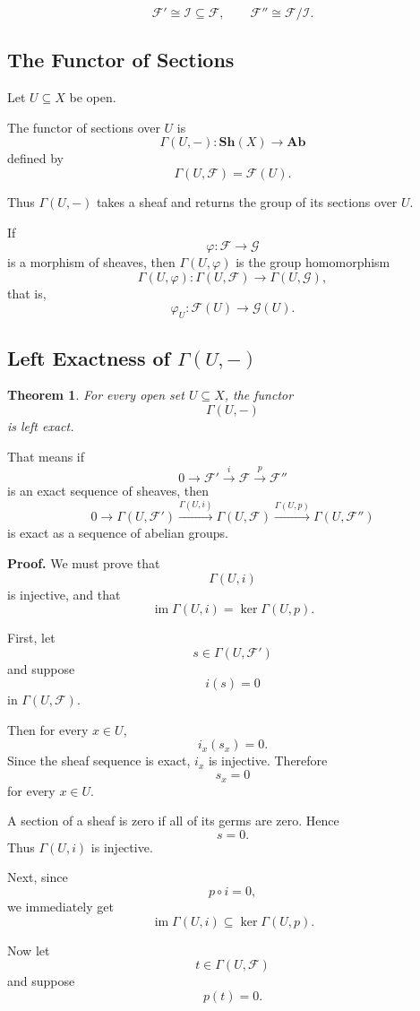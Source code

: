 \documentclass[12pt,a4paper]{article}
\DeclareMathOperator{\im}{im}
\newcommand{\Ab}{\mathbf{Ab}}
\newcommand{\Sh}{\mathbf{Sh}}
\newcommand{\F}{\mathcal F}
\newcommand{\G}{\mathcal G}
\theoremstyle{notespace}
\newtheorem{theorem}[definition]{Theorem}
\newcommand{\Fp}{\mathcal F'}      %
\newcommand{\Fpp}{\mathcal F''}
\begin{document}
\[
\boxed{
	\Fp\cong \mathcal I\subseteq \F,
	\qquad
	\Fpp\cong \F/\mathcal I.
}
\]

\subsection{The Functor of Sections}

Let \(U\subseteq X\) be open.

The functor of sections over \(U\) is
\[
\Gamma(U,-):\Sh(X)\to \Ab
\]
defined by
\[
\Gamma(U,\F)=\F(U).
\]

Thus \(\Gamma(U,-)\) takes a sheaf and returns the group of its sections over \(U\).

If
\[
\varphi:\F\to \G
\]
is a morphism of sheaves, then \(\Gamma(U,\varphi)\) is the group homomorphism
\[
\Gamma(U,\varphi):\Gamma(U,\F)\to \Gamma(U,\G),
\]
that is,
\[
\varphi_U:\F(U)\to \G(U).
\]

\subsection{Left Exactness of \texorpdfstring{\(\Gamma(U,-)\)}{Gamma(U,-)}}

\begin{theorem}
	For every open set \(U\subseteq X\), the functor
	\[
	\Gamma(U,-)
	\]
	is left exact.
\end{theorem}

That means if
\[
0\longrightarrow \Fp
\xrightarrow{i}
\F
\xrightarrow{p}
\Fpp
\]
is an exact sequence of sheaves, then
\[
0\longrightarrow \Gamma(U,\Fp)
\xrightarrow{\Gamma(U,i)}
\Gamma(U,\F)
\xrightarrow{\Gamma(U,p)}
\Gamma(U,\Fpp)
\]
is exact as a sequence of abelian groups.

\textbf{Proof.}
We must prove that
\[
\Gamma(U,i)
\]
is injective, and that
\[
\im \Gamma(U,i)=\ker \Gamma(U,p).
\]

First, let
\[
s\in \Gamma(U,\Fp)
\]
and suppose
\[
i(s)=0
\]
in \(\Gamma(U,\F)\).

Then for every \(x\in U\),
\[
i_x(s_x)=0.
\]
Since the sheaf sequence is exact, \(i_x\) is injective. Therefore
\[
s_x=0
\]
for every \(x\in U\).

A section of a sheaf is zero if all of its germs are zero. Hence
\[
s=0.
\]
Thus \(\Gamma(U,i)\) is injective.

Next, since
\[
p\circ i=0,
\]
we immediately get
\[
\im \Gamma(U,i)\subseteq \ker \Gamma(U,p).
\]

Now let
\[
t\in \Gamma(U,\F)
\]
and suppose
\[
p(t)=0.
\]
\end{document}
